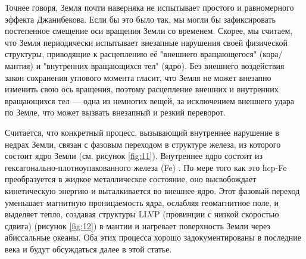 \documentclass[10pt,twocolumn,letterpaper]{article}
\begin{document}
Точнее говоря, Земля почти наверняка не испытывает простого и равномерного эффекта Джанибекова. Если бы это было так, мы могли бы зафиксировать постепенное смещение оси вращения Земли со временем. Скорее, мы считаем, что Земля периодически испытывает внезапные нарушения своей физической структуры, приводящие к расцеплению её "внешнего вращающегося" (кора/мантия) и "внутренних вращающихся тел" (ядро). Без внешнего воздействия закон сохранения углового момента гласит, что Земля не может внезапно изменить свою ось вращения, поэтому расцепление внешних и внутренних вращающихся тел — одна из немногих вещей, за исключением внешнего удара по Земле, что может вызвать внезапный и резкий переворот.

Считается, что конкретный процесс, вызывающий внутреннее нарушение в недрах Земли, связан с фазовым переходом в структуре железа, из которого состоит ядро Земли (см. рисунок \ref{fig:11}). Внутреннее ядро состоит из гексагонально-плотноупакованного железа (Fe) \cite{141}. По мере того как это hcp-Fe преобразуется в жидкое металлическое состояние, оно высвобождает кинетическую энергию и выталкивается во внешнее ядро. Этот фазовый переход уменьшает магнитную проницаемость ядра, ослабляя геомагнитное поле, и выделяет тепло, создавая структуры LLVP (провинции с низкой скоростью сдвига) (рисунок \ref{fig:12}) \cite{38} в мантии и нагревает поверхность Земли через абиссальные океаны. Оба этих процесса хорошо задокументированы в последние века и будут обсуждаться далее в этой статье.
\end{document}
